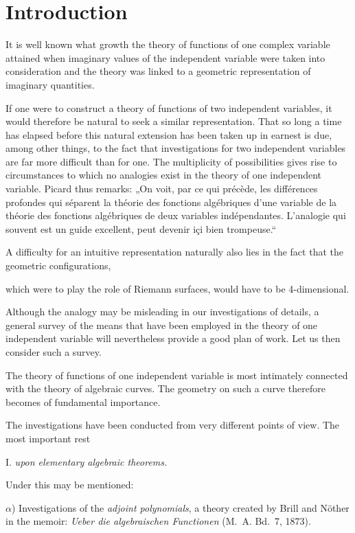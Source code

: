 \documentclass{article}
\begin{document}
\section*{Introduction}

It is well known what growth the theory of functions of one complex variable attained when imaginary values of the independent variable were taken into consideration and the theory was linked to a geometric representation of imaginary quantities.

If one were to construct a theory of functions of two independent variables, it would therefore be natural to seek a similar representation. That so long a time has elapsed before this natural extension has been taken up in earnest is due, among other things, to the fact that investigations for two independent variables are far more difficult than for one. The multiplicity of possibilities gives rise to circumstances to which no analogies exist in the theory of one independent variable. Picard thus remarks: „On voit, par ce qui précède, les différences profondes qui séparent la théorie des fonctions algébriques d'une variable de la théorie des fonctions algébriques de deux variables indépendantes. L'analogie qui souvent est un guide excellent, peut devenir içi bien trompeuse.“

A difficulty for an intuitive representation naturally also lies in the fact that the geometric configurations,

which were to play the role of Riemann surfaces, would have to be 4-dimensional.

Although the analogy may be misleading in our investigations of details, a general survey of the means that have been employed in the theory of one independent variable will nevertheless provide a good plan of work. Let us then consider such a survey.

The theory of functions of one independent variable is most intimately connected with the theory of algebraic curves. The geometry on such a curve therefore becomes of fundamental importance.

The investigations have been conducted from very different points of view. The most important rest

I. \emph{upon elementary algebraic theorems.}

Under this may be mentioned:

$\alpha$) Investigations of the \emph{adjoint polynomials}, a theory created by Brill and Nöther in the memoir: \emph{Ueber die algebraischen Functionen} (M.~A. Bd.~7, 1873).
\end{document}
